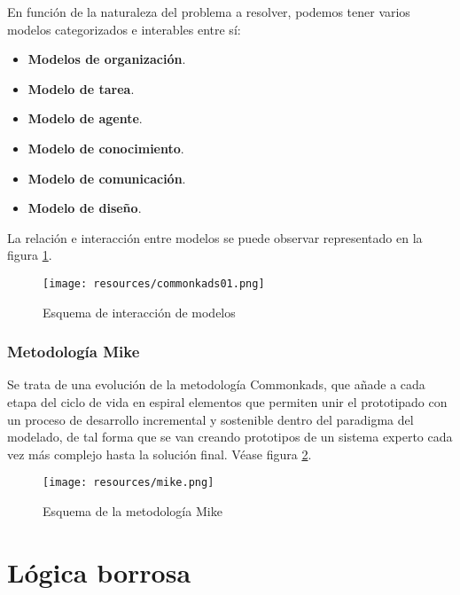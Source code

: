\documentclass[a4paper, 11pt, titlepage]{article}
\begin{document}
            En función de la naturaleza del problema a resolver, podemos tener varios modelos 
            categorizados e interables entre sí:

            \begin{itemize}
                \item \textbf{Modelos de organización}.
                \item \textbf{Modelo de tarea}.
                \item \textbf{Modelo de agente}. 
                \item \textbf{Modelo de conocimiento}.
                \item \textbf{Modelo de comunicación}. 
                \item \textbf{Modelo de diseño}. 
            \end{itemize}

            La relación e interacción entre modelos se puede observar representado en la 
            figura \ref{commonkads01}.

            \begin{figure}[htp]
                \centering
                \texttt{[image: resources/commonkads01.png]}
                \caption{Esquema de interacción de modelos}
                \label{commonkads01}
            \end{figure}    

        \subsubsection{Metodología Mike}

            Se trata de una evolución de la metodología Commonkads, que añade a cada etapa del 
            ciclo de vida en espiral elementos que permiten unir el prototipado con un proceso 
            de desarrollo incremental y sostenible dentro del paradigma del modelado, de tal 
            forma que se van creando prototipos de un sistema experto cada vez más complejo hasta
            la solución final. Véase figura \ref{mike}.

            \begin{figure}[htp]
                \centering
                \texttt{[image: resources/mike.png]}
                \caption{Esquema de la metodología Mike}
                \label{mike}
            \end{figure}    

\section{Lógica borrosa}
\end{document}
